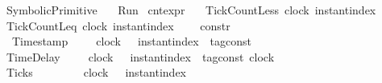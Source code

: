%
\begin{isabellebody}%
%
%
\isadelimtheory
%
\endisadelimtheory
%
\isatagtheory
{}\isamarkupfalse%
\ SymbolicPrimitive\isanewline
\ \ \ Run\isanewline
\isanewline
{}%
\endisatagtheory
{\isafoldtheory}%
%
\isadelimtheory
\isanewline
%
\endisadelimtheory
{}\isamarkupfalse%
\ cnt{\isacharunderscore}expr\ {\isacharequal}\isanewline
\ \ TickCountLess\ {\isacartoucheopen}clock{\isacartoucheclose}\ {\isacartoucheopen}instant{\isacharunderscore}index{\isacartoucheclose}\ {\isacharparenleft}{\isachardoublequoteopen}{\isacharhash}\isactrlsup {\isacharless}{\isachardoublequoteclose}{\isacharparenright}\isanewline
{\isacharbar}\ TickCountLeq\ {\isacartoucheopen}clock{\isacartoucheclose}\ {\isacartoucheopen}instant{\isacharunderscore}index{\isacartoucheclose}\ \ {\isacharparenleft}{\isachardoublequoteopen}{\isacharhash}\isactrlsup {\isasymle}{\isachardoublequoteclose}{\isacharparenright}%
\isadelimdocument
%
\endisadelimdocument
%
\isatagdocument
%
\isamarkuptrue%
%
\endisatagdocument
{\isafolddocument}%
%
\isadelimdocument
%
\endisadelimdocument
{}\isamarkupfalse%
\ {\isacharprime}{\isasymtau}\ constr\ {\isacharequal}\isanewline
\ \ Timestamp\ \ \ \ \ {\isacartoucheopen}clock{\isacartoucheclose}\ \ \ {\isacartoucheopen}instant{\isacharunderscore}index{\isacartoucheclose}\ {\isacartoucheopen}{\isacharprime}{\isasymtau}\ tag{\isacharunderscore}const{\isacartoucheclose}\ \ \ \ \ \ \ \ \ {\isacharparenleft}{\isachardoublequoteopen}{\isacharunderscore}\ {\isasymDown}\ {\isacharunderscore}\ {\isacharat}\ {\isacharunderscore}{\isachardoublequoteclose}{\isacharparenright}\isanewline
{\isacharbar}\ TimeDelay\ \ \ \ \ {\isacartoucheopen}clock{\isacartoucheclose}\ \ \ {\isacartoucheopen}instant{\isacharunderscore}index{\isacartoucheclose}\ {\isacartoucheopen}{\isacharprime}{\isasymtau}\ tag{\isacharunderscore}const{\isacartoucheclose}\ {\isacartoucheopen}clock{\isacartoucheclose}\ {\isacharparenleft}{\isachardoublequoteopen}{\isacharunderscore}\ {\isacharat}\ {\isacharunderscore}\ {\isasymoplus}\ {\isacharunderscore}\ {\isasymRightarrow}\ {\isacharunderscore}{\isachardoublequoteclose}{\isacharparenright}\isanewline
{\isacharbar}\ Ticks\ \ \ \ \ \ \ \ \ {\isacartoucheopen}clock{\isacartoucheclose}\ \ \ {\isacartoucheopen}instant{\isacharunderscore}index{\isacartoucheclose}\ \ \ \ \ \ \ \ \ \ \ \ \ \ \ \ \ \ \ \ \ \ \ \ {\isacharparenleft}{\isachardoublequoteopen}{\isacharunderscore}\ {\isasymUp}\ {\isacharunderscore}{\isachardoublequoteclose}{\isacharparenright}\isanewline

\end{isabellebody}
